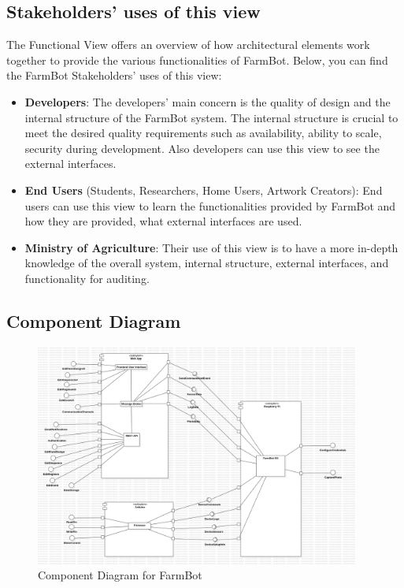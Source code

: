 \subsection{Stakeholders’ uses of this view}
The Functional View offers an overview of how architectural elements work together to provide the various functionalities of FarmBot. Below, you can find the FarmBot Stakeholders' uses of this view:
\begin{itemize}
    \item \textbf{Developers}: The developers' main concern is the quality of design and the internal structure of the FarmBot system. The internal structure is crucial to meet the desired quality requirements such as availability, ability to scale, security during development. Also developers can use this view to see the external interfaces.
    \item \textbf{End Users} (Students, Researchers, Home Users, Artwork Creators): End users can use this view to learn the functionalities provided by FarmBot and how they are provided, what external interfaces are used.
    \item \textbf{Ministry of Agriculture}: Their use of this view is to have a more in-depth knowledge of the overall system, internal structure, external interfaces, and functionality for auditing.
\end{itemize}

\subsection{Component Diagram}

\begin{figure}[H]
    \centering
    \includegraphics[width=0.95\textwidth]{Figures/ComponentDiagram.png}
    \caption{Component Diagram for FarmBot}\label{fig:ComponentDiagram}
\end{figure}

